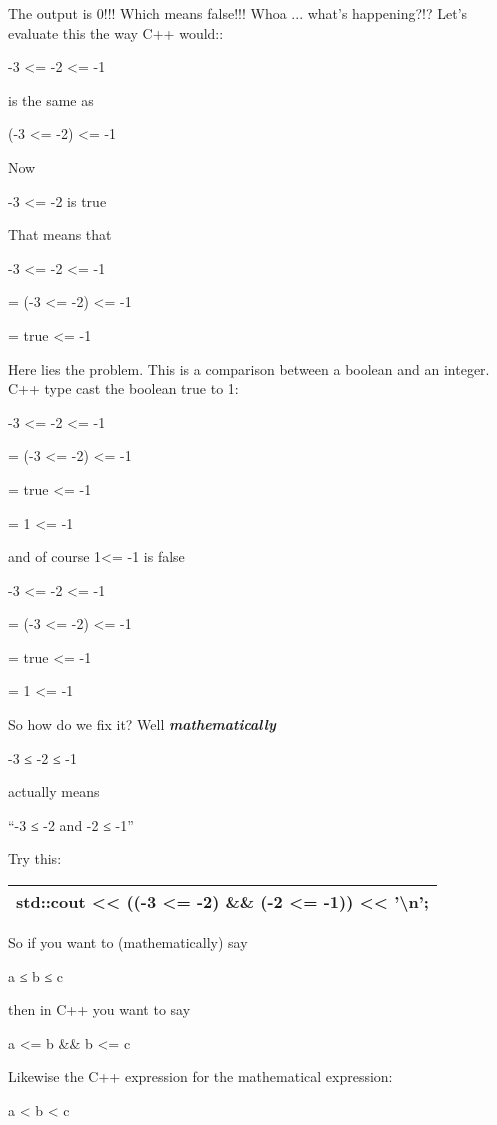 \documentclass[
]{article}
\begin{document}
The output is 0!!! Which means false!!! Whoa ... what's happening?!?
Let's evaluate this the way C++ would::

-3 \textless= -2 \textless= -1

is the same as

(-3 \textless= -2) \textless= -1

Now

-3 \textless= -2 is true

That means that

-3 \textless= -2 \textless= -1

= (-3 \textless= -2) \textless= -1

= true \textless= -1

Here lies the problem. This is a comparison between a boolean and an
integer. C++ type cast the boolean true to 1:

-3 \textless= -2 \textless= -1

= (-3 \textless= -2) \textless= -1

= true \textless= -1

= 1 \textless= -1

and of course 1\textless= -1 is false

-3 \textless= -2 \textless= -1

= (-3 \textless= -2) \textless= -1

= true \textless= -1

= 1 \textless= -1

So how do we fix it? Well \emph{\textbf{mathematically}}

-3 ≤ -2 ≤ -1

actually means

``-3 ≤ -2 and -2 ≤ -1''

Try this:

\begin{longtable}[]{@{}l@{}}
\toprule
\endhead
std::cout \textless\textless{} ((-3 \textless= -2) \&\& (-2 \textless=
-1)) \textless\textless{} '\textbackslash n';\tabularnewline
\bottomrule
\end{longtable}

So if you want to (mathematically) say

a ≤ b ≤ c

then in C++ you want to say

a \textless= b \&\& b \textless= c

Likewise the C++ expression for the mathematical expression:

a \textless{} b \textless{} c
\end{document}
